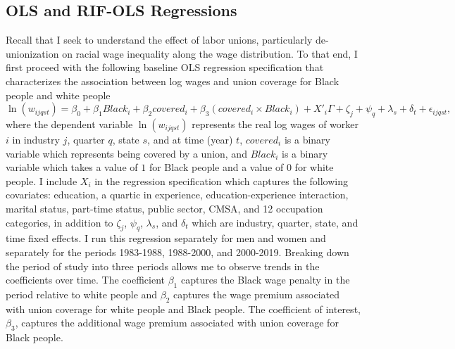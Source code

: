 \documentclass[11pt]{article}
\begin{document}

\subsection{OLS and RIF-OLS Regressions}
Recall that I seek to understand the effect of labor unions, particularly de-unionization on racial wage inequality along the wage distribution. To that end, I first proceed with the following baseline OLS regression specification that characterizes the association between log wages and union coverage for Black people and white people
\begin{equation}
    \ln(w_{ijqst}) = \beta_0 + \beta_1 Black_i + \beta_2 covered_i + \beta_3 (covered_i \times Black_i)+ X'_i\Gamma + \zeta_j + \psi_q + \lambda_s  + \delta_t + \epsilon_{ijqst},
\end{equation}
where the dependent variable $\ln(w_{ijqst})$ represents the real log wages of worker $i$ in industry $j$, quarter $q$, state $s$, and at time (year) $t$, $covered_i$ is a binary variable which represents being covered by a union, and $Black_i$ is a binary variable which takes a value of $1$ for Black people and a value of $0$ for white people. I include $X_i$ in the regression specification which captures the following covariates: education, a quartic in experience, education-experience interaction, marital status, part-time status, public sector, CMSA, and 12 occupation categories, in addition to $\zeta_j$, $\psi_q$, $\lambda_s$, and $\delta_t$ which are industry, quarter, state, and time fixed effects. I run this regression separately for men and women and separately for the periods 1983-1988, 1988-2000, and 2000-2019. Breaking down the period of study into three periods allows me to observe trends in the coefficients over time. The coefficient $\beta_1$ captures the Black wage penalty in the period relative to white people and $\beta_2$ captures the wage premium associated with union coverage for white people and Black people. The coefficient of interest, $\beta_3$, captures the additional wage premium associated with union coverage for Black people. 
\end{document}
